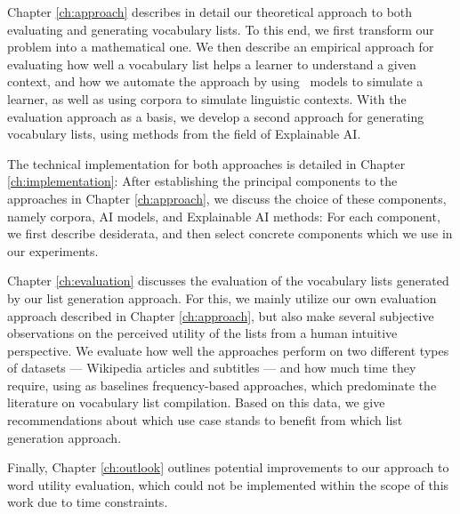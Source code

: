Chapter \ref{ch:approach} describes in detail our theoretical approach to both evaluating and generating vocabulary lists.
To this end, we first transform our problem into a mathematical one.
We then describe an empirical approach for evaluating how well a vocabulary list helps a learner to understand a given context, and how we automate the approach by using \AI\ models to simulate a learner, as well as using corpora to simulate linguistic contexts.
With the evaluation approach as a basis, we develop a second approach for generating vocabulary lists, using methods from the field of Explainable AI.

The technical implementation for both approaches is detailed in Chapter \ref{ch:implementation}:
After establishing the principal components to the approaches in Chapter \ref{ch:approach}, we discuss the choice of these components, namely corpora, AI models, and Explainable AI methods:
For each component, we first describe desiderata, and then select concrete components which we use in our experiments.


Chapter \ref{ch:evaluation} discusses the evaluation of the vocabulary lists generated by our list generation approach.
For this, we mainly utilize our own evaluation approach described in Chapter \ref{ch:approach}, but also make several subjective observations on the perceived utility of the lists from a human intuitive perspective.
We evaluate how well the approaches perform on two different types of datasets --- Wikipedia articles and subtitles --- and how much time they require, using as baselines frequency-based approaches, which predominate the literature on vocabulary list compilation.
Based on this data, we give recommendations about which use case stands to benefit from which list generation approach.

Finally, Chapter \ref{ch:outlook} outlines potential improvements to our approach to word utility evaluation, which could not be implemented within the scope of this work due to time constraints.





